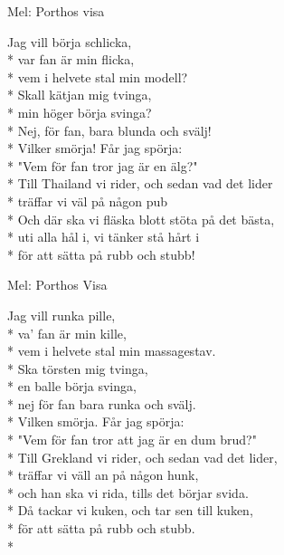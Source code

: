 \begin{SongText}
    \begin{SongInfo}
        Mel: Porthos visa
    \end{SongInfo}
    \begin{SongVerse}
        Jag vill börja schlicka, \\*%
        var fan är min flicka,\\*%
        vem i helvete stal min modell?\\*%
        Skall kätjan mig tvinga,\\*%
        min höger börja svinga?\\*%
        Nej, för fan, bara blunda och svälj!\\*%
        Vilker smörja! Får jag spörja:\\*%
        "Vem för fan tror jag är en älg?"\\*%
        Till Thailand vi rider, och sedan vad det lider\\*%
        träffar vi väl på någon pub\\*%
        Och där ska vi fläska blott stöta på det bästa,\\*%
        uti alla hål i, vi tänker stå hårt i\\*%
        för att sätta på rubb och stubb!
    \end{SongVerse}
\end{SongText}
\begin{SongText}
    \begin{SongInfo}
        Mel: Porthos Visa
    \end{SongInfo}
    \begin{SongVerse}
        Jag vill runka pille,\\*%
        va’ fan är min kille,\\*%
        vem i helvete stal min massagestav.\\*%
        Ska törsten mig tvinga,\\*%
        en balle börja svinga,\\*%
        nej för fan bara runka och svälj.\\*%
        Vilken smörja. Får jag spörja:\\*%
        "Vem för fan tror att jag är en dum brud?"\\*%
        Till Grekland vi rider, och sedan vad det lider,\\*%
        träffar vi väll an på någon hunk,\\*%
        och han ska vi rida, tills det
        börjar svida.\\*%
        Då tackar vi kuken, och tar sen till kuken,\\*%
        för att sätta på rubb och stubb. \\*%
    \end{SongVerse}
\end{SongText}
